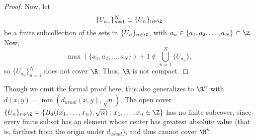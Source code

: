\documentclass[letterpaper]{article}
\begin{document}
\begin{enumerate}
\begin{proof}
Now, let 
$$\{U_{a_n}\}_{n=1}^N\subset\{U_n\}_{n\in\Z}$$ be a finite subcollection of the sets in $\{U_n\}_{n\in\Z}$, with $a_n\in\{a_1, a_2, \ldots, a_N\}\subset\Z$. Now, $$\max(\{a_1, a_2, \ldots, a_N\})+1\not\in\bigcup_{n=1}^N\{U_{a_n}\},$$ so $\{U_{a_n}\}_{n=1}^N$ does not cover $\R$. Thus, $\R$ is not compact. 
\end{proof}
\begin{remark*}
Though we omit the formal proof here, this also generalizes to $\R^n$ with $d(x,y)=\min(d_{usual}(x,y),\sqrt{n})$. The open cover $\{U_n\}_{n\in\Z}=\{B_d((x_1, \ldots, x_n), \sqrt{n}) : x_1, \ldots, x_n \in \Z\}$ has no finite subcover, since every finite subset has an element whose center has greatest absolute value (that is, farthest from the origin under $d_{usual}$), and thus cannot cover $\R^n$. 
\end{remark*}
\end{enumerate}
\end{document}
